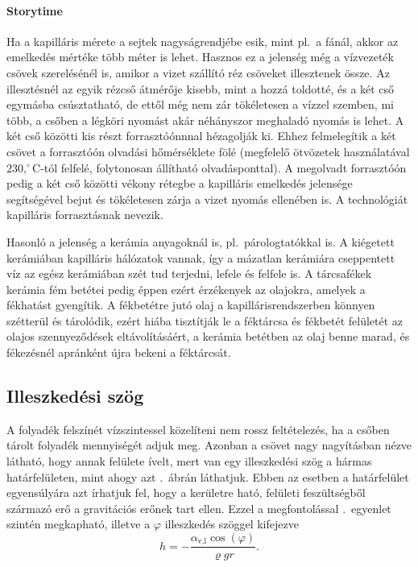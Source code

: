 \documentclass[12pt,a4paper]{scrartcl}
\begin{document}
\paragraph{Storytime} Ha a kapilláris mérete a sejtek nagyságrendjébe esik, mint pl.\ a fánál, akkor az emelkedés mértéke több méter is lehet. Hasznos ez a jelenség még a vízvezeték csövek szerelésénél is, amikor a vizet szállító réz csöveket illesztenek össze. Az illesztésnél az egyik rézcső átmérője kisebb, mint a hozzá toldotté, és a két cső egymásba csúsztatható, de ettől még nem zár tökéletesen a vízzel szemben, mi több, a csőben a légköri nyomást akár néhányszor meghaladó nyomás is lehet. A két cső közötti kis részt forrasztóónnnal hézagolják ki. Ehhez felmelegítik a két csövet a forrasztóón olvadási hőmérséklete fölé (megfelelő ötvözetek használatával $230{,}^\circ$C-tól felfelé, folytonosan állítható olvadásponttal). A megolvadt forrasztóón pedig a két cső közötti vékony rétegbe a kapilláris emelkedés jelensége segítségével bejut és tökéletesen zárja a vizet nyomás ellenében is. A technológiát kapilláris forrasztásnak nevezik.

Hasonló a jelenség a kerámia anyagoknál is, pl.\ párologtatókkal is. A kiégetett kerámiában kapilláris hálózatok vannak, így a mázatlan kerámiára cseppentett víz az egész kerámiában szét tud terjedni, lefele és felfele is. A tárcsafékek kerámia fém betétei pedig éppen ezért érzékenyek az olajokra, amelyek a fékhatást gyengítik. A fékbetétre jutó olaj a kapillárisrendszerben könnyen szétterül és tárolódik, ezért hiába tisztítják le a féktárcsa és fékbetét felületét az olajos szennyeződések eltávolításáért, a kerámia betétben az olaj benne marad, és fékezésnél apránként újra bekeni a féktárcsát.
\normalsize

\subsection{Illeszkedési szög}
A folyadék felszínét vízszintessel közelíteni nem rossz feltételezés, ha a csőben tárolt folyadék mennyiségét adjuk meg. Azonban a csövet nagy nagyításban nézve látható, hogy annak felülete ívelt, mert van egy illeszkedési szög a hármas határfelületen, mint ahogy azt .\ ábrán láthatjuk. Ebben az esetben a határfelület egyensúlyára azt írhatjuk fel, hogy a kerületre ható, felületi feszültségből származó erő a gravitációs erőnek tart ellen. Ezzel a megfontolással .\ egyenlet szintén megkapható, illetve a $\varphi$ illeszkedés szöggel kifejezve
\[h =  - \frac{{{\alpha _{{\text{v,l}}}}\cos \left( \varphi  \right)}}{{\varrho gr}}.\]
\end{document}
